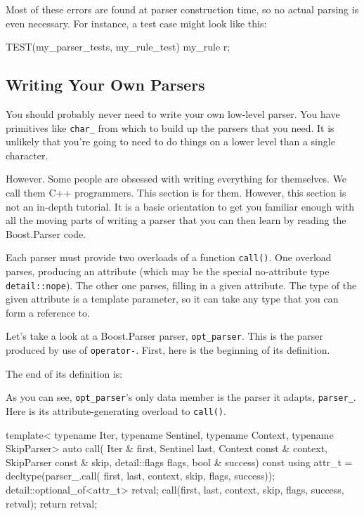 Most of these errors are found at parser construction time, so no actual parsing is even necessary. For instance, a test case might look like this:

\begin{code}
TEST(my_parser_tests, my_rule_test) {
    my_rule r;
}
\end{code}

\subsection{Writing Your Own Parsers}

You should probably never need to write your own low-level parser. You have primitives like \texttt{char\_} from which to build up the parsers that you need. It is unlikely that you're going to need to do things on a lower level than a single character.

However. Some people are obsessed with writing everything for themselves. We call them C++ programmers. This section is for them. However, this section is not an in-depth tutorial. It is a basic orientation to get you familiar enough with all the moving parts of writing a parser that you can then learn by reading the Boost.Parser code.

Each parser must provide two overloads of a function \texttt{call()}. One overload parses, producing an attribute (which may be the special no-attribute type \texttt{detail::nope}). The other one parses, filling in a given attribute. The type of the given attribute is a template parameter, so it can take any type that you can form a reference to.

Let's take a look at a Boost.Parser parser, \texttt{opt\_parser}. This is the parser produced by use of \texttt{operator-}. First, here is the beginning of its definition.

\begin{code}
template<typename Parser>
struct opt_parser
{
\end{code}

The end of its definition is:

\begin{code}
    Parser parser_;
};
\end{code}

As you can see, \texttt{opt\_parser}'s only data member is the parser it adapts, \texttt{parser\_}. Here is its attribute-generating overload to \texttt{call()}.

\begin{code}
template<
    typename Iter,
    typename Sentinel,
    typename Context,
    typename SkipParser>
auto call(
    Iter & first,
    Sentinel last,
    Context const & context,
    SkipParser const & skip,
    detail::flags flags,
    bool & success) const
{
    using attr_t = decltype(parser_.call(
        first, last, context, skip, flags, success));
    detail::optional_of<attr_t> retval;
    call(first, last, context, skip, flags, success, retval);
    return retval;
}
\end{code}


